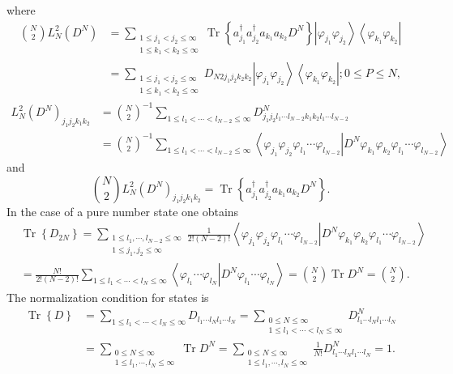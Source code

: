 \documentclass[aps,preprint]{revtex4}%
\begin{document}
where%
\begin{align}
\binom{N}{2}L_{N}^{2}\left(  D^{N}\right)   &  =\sum_{\substack{1\leq
j_{1}<j_{2}\leq\infty\\1\leq k_{1}<k_{2}\leq\infty}}\operatorname{Tr}\left\{
a_{j_{1}}^{\dagger}a_{j_{2}}^{\dagger}a_{k_{1}}a_{k_{2}}D^{N}\right\}
\left\vert \varphi_{j_{1}}\varphi_{j_{2}}\right\rangle \left\langle
\varphi_{k_{1}}\varphi_{k_{2}}\right\vert \nonumber\\
&  =\sum_{\substack{1\leq j_{1}<j_{2}\leq\infty\\1\leq k_{1}<k_{2}\leq\infty
}}D_{N2j_{1}j_{2}k_{2}k_{2}}\left\vert \varphi_{j_{1}}\varphi_{j_{2}%
}\right\rangle \left\langle \varphi_{k_{1}}\varphi_{k_{2}}\right\vert ;0\leq
P\leq N,
\end{align}%
\begin{align}
L_{N}^{2}\left(  D^{N}\right)  _{j_{1}j_{2}k_{1}k_{2}}  &  =\binom{N}{2}%
^{-1}\sum_{1\leq l_{1}<\cdots<l_{N-2}\leq\infty}D_{j_{1}j_{2}l_{1}\cdots
l_{N-2}k_{1}k_{2}l_{1}\cdots l_{N-2}}^{N}\nonumber\\
&  =\binom{N}{2}^{-1}\sum_{1\leq l_{1}<\cdots<l_{N-2}\leq\infty}\left\langle
\left.  \varphi_{j_{1}}\varphi_{j_{2}}\varphi_{l_{1}}\cdots\varphi_{l_{N-2}%
}\right\vert D^{N}\varphi_{k_{1}}\varphi_{k_{2}}\varphi_{l_{1}}\cdots
\varphi_{l_{N-2}}\right\rangle
\end{align}
and
\begin{equation}
\binom{N}{2}L_{N}^{2}\left(  D^{N}\right)  _{j_{1}j_{2}k_{1}k_{2}%
}=\operatorname{Tr}\left\{  a_{j_{1}}^{\dagger}a_{j_{2}}^{\dagger}a_{k_{1}%
}a_{k_{2}}D^{N}\right\}  .
\end{equation}
In the case of a pure number state one obtains%
\begin{align}
&  \operatorname{Tr}\left\{  D_{2N}\right\}  =\sum_{\substack{1\leq
l_{1},\cdots,l_{N-2}\leq\infty\\1\leq j_{1},j_{2}\leq\infty}}\frac
{1}{2!\left(  N-2\right)  !}\left\langle \left.  \varphi_{j_{1}}\varphi
_{j_{2}}\varphi_{l_{1}}\cdots\varphi_{l_{N-2}}\right\vert D^{N}\varphi_{k_{1}%
}\varphi_{k_{2}}\varphi_{l_{1}}\cdots\varphi_{l_{N-2}}\right\rangle
\nonumber\\
&  =\frac{N!}{2!\left(  N-2\right)  !}\sum_{1\leq l_{1}<\cdots<l_{N}\leq
\infty}\left\langle \left.  \varphi_{l_{1}}\cdots\varphi_{l_{N}}\right\vert
D^{N}\varphi_{l_{1}}\cdots\varphi_{l_{N}}\right\rangle =\binom{N}%
{2}\operatorname{Tr}D^{N}=\binom{N}{2}.
\end{align}
The normalization condition for states is
\begin{align}
\operatorname{Tr}\left\{  D\right\}   &  =\sum_{1\leq l_{1}<\cdots<l_{N}%
\leq\infty}D_{l_{1}\cdots l_{N}l_{1}\cdots l_{N}}=\sum_{\substack{0\leq
N\leq\infty\\1\leq l_{1}<\cdots<l_{N}\leq\infty}}D_{l_{1}\cdots l_{N}%
l_{1}\cdots l_{N}}^{N}\nonumber\\
&  =\sum_{\substack{0\leq N\leq\infty\\1\leq l_{1},\cdots,l_{N}\leq\infty
}}\operatorname{Tr}D^{N}=\sum_{\substack{0\leq N\leq\infty\\1\leq l_{1}%
,\cdots,l_{N}\leq\infty}}\frac{1}{N!}D_{l_{1}\cdots l_{N}l_{1}\cdots l_{N}%
}^{N}=1.
\end{align}
\end{document}
